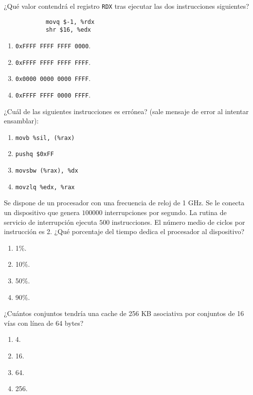 \documentclass[12pt]{article}
\begin{document}
    \begin{ejercicio}
        ¿Qué valor contendrá el registro \verb|RDX| tras ejecutar las dos instrucciones siguientes?
        \begin{verbatim}
            movq $-1, %rdx
            shr $16, %edx
        \end{verbatim}
        \begin{enumerate}[label=\alph*)]
            \item \verb|0xFFFF FFFF FFFF 0000|.
            \item \verb|0xFFFF FFFF FFFF FFFF|.
            \item \verb|0x0000 0000 0000 FFFF|.
            \item \verb|0xFFFF FFFF 0000 FFFF|.
        \end{enumerate}
    \end{ejercicio}
    \begin{ejercicio}
        ¿Cuál de las siguientes instrucciones es errónea? (sale mensaje de error al intentar ensamblar):
        \begin{enumerate}[label=\alph*)]
            \item \verb|movb %sil, (%rax)|
            \item \verb|pushq $0xFF|
            \item \verb|movsbw (%rax), %dx|
            \item \verb|movzlq %edx, %rax|
        \end{enumerate}
    \end{ejercicio}
    \begin{ejercicio}
        Se dispone de un procesador con una frecuencia de reloj de 1 GHz. Se le conecta un dispositivo que genera $100000$ interrupciones por segundo. La rutina de servicio de interrupción ejecuta $500$ instrucciones. El número medio de ciclos por instrucción es 2. ¿Qué porcentaje del tiempo dedica el procesador al dispositivo?
        \begin{enumerate}[label=\alph*)]
            \item 1\%.
            \item 10\%.
            \item 50\%.
            \item 90\%.
        \end{enumerate}
    \end{ejercicio}
    \begin{ejercicio}
        ¿Cuántos conjuntos tendría una cache de 256 KB asociativa por conjuntos de 16 vías con línea de 64 bytes?
        \begin{enumerate}[label=\alph*)]
            \item 4.
            \item 16.
            \item 64.
            \item 256.
        \end{enumerate}
    \end{ejercicio}
\end{document}
